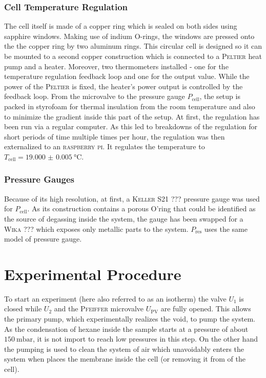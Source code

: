 \documentclass[../thesis.tex]{subfiles}
\begin{document}
            \subsubsection{Cell Temperature Regulation}
            \label{subsec:tcell-regulation}

                The cell itself is made of a copper ring which is sealed on both sides using sapphire windows. Making use of indium O-rings, the windows are pressed onto the the copper ring by two aluminum rings. This circular cell is designed so it can be mounted to a second copper construction which is connected to a \textsc{Peltier} heat pump and a heater. Moreover, two thermometers installed - one for the temperature regulation feedback loop and one for the output value. While the power of the \textsc{Peltier} is fixed, the heater's power output is controlled by the feedback loop. From the microvalve to the pressure gauge $P_\mathrm{cell}$, the setup is packed in styrofoam for thermal insulation from the room temperature and also to minimize the gradient inside this part of the setup. At first, the regulation has been run via a regular computer. As this led to breakdowns of the regulation for short periods of time multiple times per hour,  the regulation was then externalized to an \textsc{raspberry pi}. It regulates the temperature to $T_\mathrm{cell}=\SI{19.000(5)}{\celsius}$.


            \subsubsection{Pressure Gauges}

                Because of its high resolution, at first, a \textsc{Keller} S21 ??? pressure gauge was used for $P_\mathrm{cell}$. As its construction contains a porous O'ring that could be identified as the source of degassing inside the system, the gauge has been swapped for a \textsc{Wika} ??? which exposes only metallic parts to the system. $P_\mathrm{res}$ uses the same model of pressure gauge.


    \section{Experimental Procedure}
            \label{sec:experimental-procedure}

                To start an experiment (here also referred to as an isotherm) the valve $U_1$ is closed while $U_2$ and the \textsc{Pfeiffer} microvalve $U_\mathrm{PV}$ are fully opened. This allows the primary pump, which experimentally realizes the void, to pump the system. As the condensation of hexane inside the sample starts at a pressure of about $\SI{150}{\milli\bar}$, it is not import to reach low pressures in this step. On the other hand the pumping is used to clean the system of air which unavoidably enters the system when places the membrane inside the cell (or removing it from of the cell).
\end{document}
